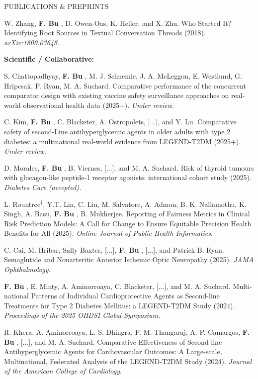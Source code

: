 \documentclass{resume} %
\newcommand{\thisYear}[1]{
	#1
}
\newcommand{\myName}[1]{
	\textbf{#1}
}
\begin{document}
\begin{rSection}{PUBLICATIONS \& PREPRINTS}
\smallskip

W. Zhang, \myName{F. Bu}, D. Owen-Oas, K. Heller, and X. Zhu. 
Who Started It? Identifying Root Sources in Textual Conversation Threads (2018). \emph{arXiv:1809.03648}.

\medskip

\hspace{-.2in} \textbf{Scientific / Collaborative:}

S. Chattopadhyay, \myName{F. Bu}, M. J. Schuemie, J. A. McLeggon, E. Westlund, G. Hripcsak, P. Ryan, M. A. Suchard. 
Comparative performance of the concurrent comparator design with existing vaccine safety surveillance approaches on real-world observational health data (2025+). \emph{Under review}. 

\smallskip 

C. Kim, \myName{F. Bu}, C. Blacketer, A. Ostropolets, [...], and Y. Lu. Comparative safety of second-Line antihyperglycemic agents in older adults with type 2 diabetes: a multinational real-world evidence from LEGEND-T2DM (2025+). \emph{Under review}.  

\smallskip 

D. Morales, \myName{F. Bu}, B. Viernes, [...], and M. A. Suchard. Risk of thyroid tumours with glucagon-like peptide-1 receptor agonists: international cohort study (2025). \emph{Diabetes Care (accepted).} 

\smallskip 

L. Rountree$^\dagger$, Y.T.  Lin, C. Liu, M. Salvatore, A.  Admon, B. K. Nallamothu, K. Singh, A. Basu, \myName{F. Bu}, B. Mukherjee. Reporting of Fairness Metrics in Clinical Risk Prediction Models: A Call for Change to Ensure Equitable Precision Health Benefits for All (2025). \emph{Online Journal of Public Health Informatics}.

\smallskip 

C. Cai, M. Hribar, Sally Baxter, [...],  \myName{F. Bu}, [...], and Patrick B. Ryan. 
Semaglutide and Nonarteritic Anterior Ischemic Optic Neuropathy (2025). \emph{JAMA Ophthalmology}.  

\smallskip

\myName{F. Bu}, E. Minty, A. Aminorroaya, C. Blacketer, [...], and M. A. Suchard. 
Multi-national Patterns of Individual Cardioprotective Agents as Second-line Treatments for Type 2 Diabetes Mellitus: a LEGEND-T2DM Study (2024). \emph{Proceedings of the 2025 OHDSI Global Symposium.}

\thisYear{
R. Khera, A. Aminorroaya, L. S. Dhingra, P. M.  Thangaraj, A. P. Camargos, \myName{F. Bu}, [...], and M. A. Suchard. Comparative Effectiveness of Second-line Antihyperglycemic Agents for Cardiovascular Outcomes: A Large-scale, Multinational, Federated Analysis of the LEGEND-T2DM Study (2024). \emph{Journal of the American College of Cardiology}. 
}


\end{rSection}
\end{document}

